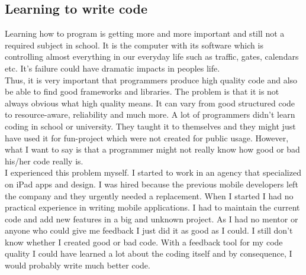\subsection{Learning to write code}
Learning how to program is getting more and more important and still not a required subject in school. It is the computer with its software which is controlling almost everything in our everyday life such as traffic, gates, calendars etc. It's failure could have dramatic impacts in peoples life.\\
Thus, it is very important that programmers produce high quality code and also be able to find good frameworks and libraries. The problem is that it is not always obvious what high quality means. It can vary from good structured code to resource-aware, reliability and much more. A lot of programmers didn't learn coding in school or university. They taught it to themselves and they might just have used it for fun-project which were not created for public usage. However, what I want to say is that a programmer might not really know how good or bad his/her code really is.\\
I experienced this problem myself.
I started to work in an agency that specialized on iPad apps and design. I was hired because the previous mobile developers left the company and they urgently needed a replacement. When I started I had no practical experience in writing mobile applications. I had to maintain the current code and add new features in a big and unknown project. As I had no mentor or anyone who could give me feedback I just did it as good as I could. I still don't know whether I created good or bad code. With a feedback tool for my code quality I could have learned a lot about the coding itself and by consequence, I would probably write much better code.

